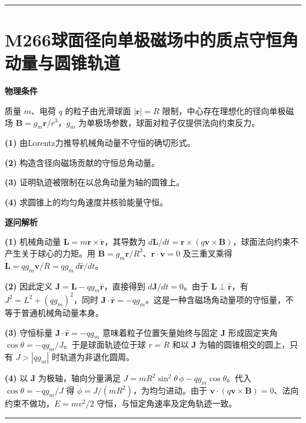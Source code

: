 \documentclass[UTF8,a4paper,11pt,oneside,openany]{ctexbook}
\begin{document}
\par\bigskip\hrule\bigskip
\section*{M266\quad 球面径向单极磁场中的质点守恒角动量与圆锥轨道}
\textbf{物理条件}\par 质量 \(m\)、电荷 \(q\) 的粒子由光滑球面 \(|\boldsymbol r|=R\) 限制，中心存在理想化的径向单极磁场 \(\boldsymbol B=g_m\boldsymbol r/r^3\)，\(g_m\) 为单极场参数，球面对粒子仅提供法向约束反力。
\par\noindent\textbf{(1)} 由Lorentz力推导机械角动量不守恒的确切形式。
\par\noindent\textbf{(2)} 构造含径向磁场贡献的守恒总角动量。
\par\noindent\textbf{(3)} 证明轨迹被限制在以总角动量为轴的圆锥上。
\par\noindent\textbf{(4)} 求圆锥上的均匀角速度并核验能量守恒。

\par\medskip\noindent\textbf{逐问解析}
\par\noindent\textbf{(1)} 机械角动量 \(\boldsymbol L=m\boldsymbol r\times\dot{\boldsymbol r}\)，其导数为 \(d\boldsymbol L/dt=\boldsymbol r\times(q\boldsymbol v\times\boldsymbol B)\)，球面法向约束不产生关于球心的力矩。用 \(\boldsymbol B=g_m\boldsymbol r/R^3\)、\(\boldsymbol r\cdot\boldsymbol v=0\) 及三重叉乘得 \(\dot{\boldsymbol L}=qg_m\boldsymbol v/R=qg_m\,d\hat{\boldsymbol r}/dt\)。
\par\noindent\textbf{(2)} 因此定义 \(\boldsymbol J=\boldsymbol L-qg_m\hat{\boldsymbol r}\)，直接得到 \(d\boldsymbol J/dt=0\)。由于 \(\boldsymbol L\perp\hat{\boldsymbol r}\)，有 \(J^2=L^2+(qg_m)^2\)，同时 \(\boldsymbol J\cdot\hat{\boldsymbol r}=-qg_m\)。这是一种含磁场角动量项的守恒量，不等于普通机械角动量本身。
\par\noindent\textbf{(3)} 守恒标量 \(\boldsymbol J\cdot\hat{\boldsymbol r}=-qg_m\) 意味着粒子位置矢量始终与固定 \(\boldsymbol J\) 形成固定夹角 \(\cos\theta=-qg_m/J\)。于是球面轨迹位于球 \(r=R\) 和以 \(\boldsymbol J\) 为轴的圆锥相交的圆上，只有 \(J>|qg_m|\) 时轨道为非退化圆周。
\par\noindent\textbf{(4)} 以 \(\boldsymbol J\) 为极轴，轴向分量满足 \(J=mR^2\sin^2\theta\,\dot\phi-qg_m\cos\theta\)。代入 \(\cos\theta=-qg_m/J\) 得 \(\dot\phi=J/(mR^2)\)，为均匀进动。由于 \(\boldsymbol v\cdot(q\boldsymbol v\times\boldsymbol B)=0\)、法向约束不做功，\(E=mv^2/2\) 守恒，与恒定角速率及定角轨迹一致。

\par\bigskip\hrule\bigskip
\end{document}
